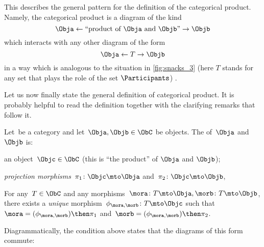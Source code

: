 This describes the general pattern for the definition of the categorical product. Namely, the categorical product is a diagram of the kind 
\begin{equation}\label{eq:prod-inline-generic-diagram}
\Obja \leftarrow \text{``product of } \Obja \text{ and } \Objb \text{''}  \rightarrow \Objb
\end{equation}
which interacts with any other diagram of the form 
\begin{equation}\label{eq:prod-inline-test-diagram}
\Obja \leftarrow T \rightarrow \Objb
\end{equation}
in a way which is analogous to the situation in \cref{fig:snacks_3} (here $T$ stands for any set that plays the role of the set $\Participants$) . 

Let us now finally state the general definition of categorical product. It is probably helpful to read the definition together with the clarifying remarks that follow it.



\begin{ctdefinition}
  \label{def:categorical-product}
  Let~\CatC be a category and let~$\Obja, \Objb \in \ObC$ be objects. The \emph{} of~$\Obja$ and~$\Objb$ is: \\ 
  \constit
  \begin{compactenum}
    \item an object~$\Objc \in \ObC$ (this is ``the product'' of $\Obja$  and $\Objb$);
    \item \emph{projection morphisms}~$\pi_1 \colon \Objc \mto \Obja$ and~$\pi_2 \colon \Objc \mto \Objb$,
  \end{compactenum}
  \condit
  \begin{compactenum}
    \item For any~$T \in \ObC$ and any morphisms~$\mora \colon T \mto \Obja, \morb \colon T \mto \Objb$, there exists a \emph{unique} morphism~$\phi_{\mora,\morb} \colon T \mto \Objc$ such that~$\mora = (\phi_{\mora,
      \morb})\then \pi_1$ and~$\morb=(\phi_{\mora, \morb})\then \pi_2$.
  \end{compactenum}
\end{ctdefinition}

\begin{remark}\label{re:prod-comm-diag}
  Diagrammatically, the condition above states that the diagrams of this form commute:
  \begin{figure}[h!]
  \end{figure}
  \label{fig:prod-def-diagram}
\end{remark}

